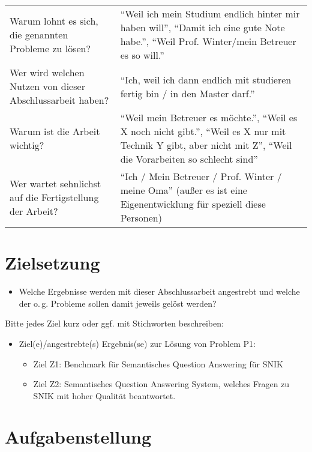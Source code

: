 \begin{tabulary}{\textwidth}{LL}
Warum lohnt es sich, die genannten Probleme zu lösen?						&\enquote{Weil ich mein Studium endlich hinter mir haben will}, \enquote{Damit ich eine gute Note habe.}, \enquote{Weil Prof. Winter/mein Betreuer es so will.}\\
Wer wird welchen Nutzen von dieser Abschlussarbeit haben?					&\enquote{Ich, weil ich dann endlich mit studieren fertig bin / in den Master darf.}\\
Warum ist die Arbeit wichtig?												&\enquote{Weil mein Betreuer es möchte.}, \enquote{Weil es X noch nicht gibt.}, \enquote{Weil es X nur mit Technik Y gibt, aber nicht mit Z}, \enquote{Weil die Vorarbeiten so schlecht sind}\\
Wer wartet sehnlichst auf die Fertigstellung der Arbeit?					&\enquote{Ich / Mein Betreuer / Prof. Winter / meine Oma} (außer es ist eine Eigenentwicklung für speziell diese Personen)\\
\end{tabulary}

\section{Zielsetzung}\label{sec:zielsetzung}

\begin{itemize}
\item Welche Ergebnisse werden mit dieser Abschlussarbeit angestrebt und welche der o.\,g. Probleme sollen damit jeweils gelöst werden?
\end{itemize}
Bitte jedes Ziel kurz oder ggf. mit Stichworten beschreiben:
\begin{itemize}
\item Ziel(e)/angestrebte(s) Ergebnis(se) zur Lösung von Problem P1:
	\begin{itemize}
	\item Ziel Z1: Benchmark für Semantisches Question Answering für SNIK
	\item Ziel Z2: Semantisches Question Answering System, welches Fragen zu SNIK mit hoher Qualität beantwortet.
	\end{itemize}
\end{itemize}

\section{Aufgabenstellung}


